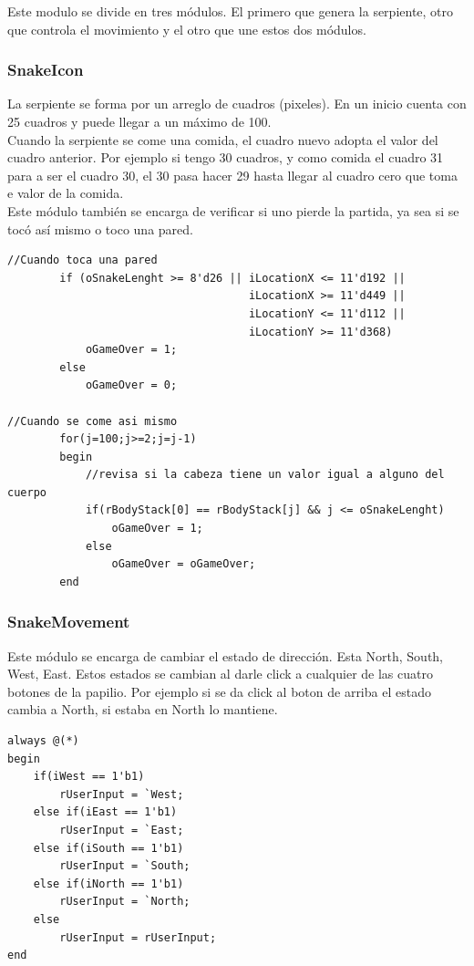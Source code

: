 \documentclass[10pt]{article}
\begin{document}
Este modulo se divide en tres módulos. El primero que genera la serpiente, otro que controla el movimiento y el otro que une estos dos módulos.

\subsubsection{SnakeIcon}

La serpiente se forma por un arreglo de cuadros (pixeles). En un inicio cuenta con 25 cuadros y puede llegar a un máximo de 100.\\

Cuando la serpiente se come una comida, el cuadro nuevo adopta el valor del cuadro anterior. Por ejemplo si tengo 30 cuadros, y como comida el cuadro 31 para a ser el cuadro 30, el 30 pasa hacer 29 hasta llegar al cuadro cero que toma e valor de la comida.\\

Este módulo también se encarga de verificar si uno pierde la partida, ya sea si se tocó así mismo o toco una pared.

\begin{lstlisting}
//Cuando toca una pared
		if (oSnakeLenght >= 8'd26 || iLocationX <= 11'd192 ||  
		                             iLocationX >= 11'd449 || 
		                             iLocationY <= 11'd112 || 
		                             iLocationY >= 11'd368)
			oGameOver = 1;
		else
			oGameOver = 0;

//Cuando se come asi mismo			
		for(j=100;j>=2;j=j-1) 
		begin
			//revisa si la cabeza tiene un valor igual a alguno del cuerpo 
			if(rBodyStack[0] == rBodyStack[j] && j <= oSnakeLenght)
				oGameOver = 1;
			else
				oGameOver = oGameOver;
		end	
\end{lstlisting}
		 
\subsubsection{SnakeMovement}
Este módulo se encarga de cambiar el estado de dirección. Esta North, South, West, East. Estos estados se cambian al darle click a cualquier de las cuatro botones de la papilio. Por ejemplo si se da click al boton de arriba el estado cambia a North, si estaba en North lo mantiene.

\begin{lstlisting}
always @(*)
begin
	if(iWest == 1'b1)
		rUserInput = `West;
	else if(iEast == 1'b1)
		rUserInput = `East;
	else if(iSouth == 1'b1) 
		rUserInput = `South;
	else if(iNorth == 1'b1)
		rUserInput = `North;
	else	
		rUserInput = rUserInput;
end
\end{lstlisting}
\end{document}
